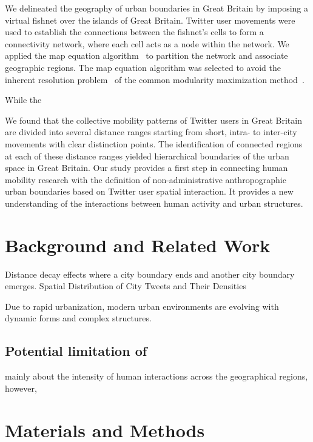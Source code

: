 \documentclass[]{tGIS2e}
\begin{document}
We delineated the geography of urban boundaries in Great Britain by imposing a virtual fishnet over the islands of Great Britain.
Twitter user movements were used to establish the connections between the fishnet's cells to form a connectivity network, where each cell acts as a node within the network.
We applied the map equation algorithm~\citep{domenico2015} to partition the network and associate geographic regions.
The map equation algorithm was selected to avoid the inherent resolution problem~\citep{fortunato2007} of the common modularity maximization method~\citep{newman2006}. 

While the 




We found that the collective mobility patterns of Twitter users in Great Britain are divided into several distance ranges starting from short, intra- to inter-city movements with clear distinction points. 
The identification of connected regions at each of these distance ranges yielded hierarchical boundaries of the urban space in Great Britain.
Our study provides a first step in connecting human mobility research with the definition of non-administrative anthropographic urban boundaries based on Twitter user spatial interaction. 
It provides a new understanding of the interactions between human activity and urban structures. 


\section{Background and Related Work}
Distance decay effects
where a city boundary ends and another city boundary emerges.
Spatial Distribution of City Tweets and Their Densities


Due to rapid urbanization, modern urban environments are evolving with dynamic forms and complex structures. 


\subsection{Potential limitation of }


mainly about the intensity of human interactions across the geographical regions, however, 

\section{Materials and Methods}
\end{document}
